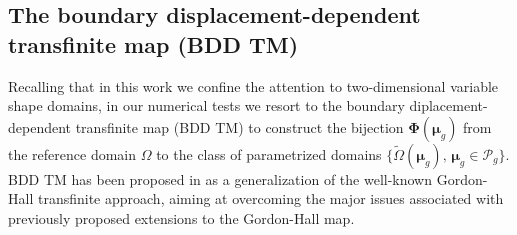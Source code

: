 \documentclass[12pt, a4paper, twoside, openright]{report}
\numberwithin{equation}{chapter}
\theoremstyle{theorem}
\theoremstyle{definition}
\theoremstyle{remark}
\theoremstyle{proposition}
\numberwithin{figure}{chapter}
\newcommand{\wt}[1]{\widetilde{#1}}
\newcommand{\bg}[1]{\boldsymbol{#1}}
\begin{document}
	\vspace*{0.3cm}
	
	\subsection{The boundary displacement-dependent transfinite map (BDD TM)}
	\label{section:The boundary displacement-dependent transfinite map}
	
		Recalling that in this work we confine the attention to two-dimensional variable shape domains, in our numerical tests we resort to the boundary diplacement-dependent transfinite map (BDD TM) to construct the bijection $\bg{\Phi}(\bg{\mu}_g)$ from the reference domain $\Omega$ to the class of parametrized domains $\big\lbrace \wt{\Omega}(\bg{\mu}_g), \, \bg{\mu}_g \in \mathcal{P}_g \big\rbrace$. BDD TM has been proposed in \cite{JIR14} as a generalization of the well-known Gordon-Hall transfinite approach, aiming at overcoming the major issues associated with previously proposed extensions to the Gordon-Hall map.
		
\end{document}
